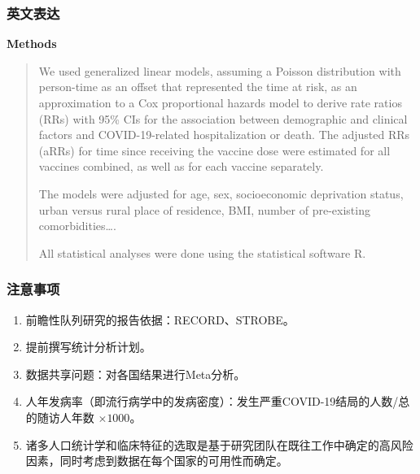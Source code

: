 \subsubsection{英文表达}
\textbf{Methods}
\begin{quote}
We used generalized linear models, assuming a Poisson distribution with person-time as an offset that represented the time at risk, as an approximation to a Cox proportional hazards model to derive rate ratios (RRs) with 95\% CIs for the association between demographic and clinical factors and COVID-19-related hospitalization or death. The adjusted RRs (aRRs) for time since receiving the vaccine dose were estimated for all vaccines combined, as well as for each vaccine separately.

The models were adjusted for age, sex, socioeconomic deprivation status, urban versus rural place of residence, BMI, number of pre-existing comorbidities\ldots.

All statistical analyses were done using the statistical software R.
\end{quote}
\subsubsection{注意事项}
\begin{enumerate}
\item 前瞻性队列研究的报告依据：RECORD、STROBE。
\item 提前撰写统计分析计划。
\item 数据共享问题：对各国结果进行Meta分析。
\item 人年发病率（即流行病学中的发病密度）：发生严重COVID-19结局的人数/总的随访人年数 $\times1000$。
\item 诸多人口统计学和临床特征的选取是基于研究团队在既往工作中确定的高风险因素，同时考虑到数据在每个国家的可用性而确定。
\end{enumerate}
